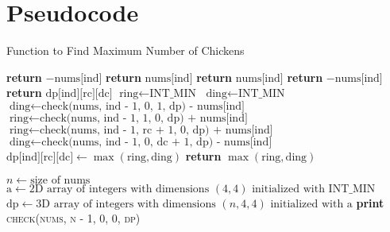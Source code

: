 \documentclass{article}
\begin{document}
\section{Pseudocode}
\begin{algorithm}
\caption{Function to Find Maximum Number of Chickens}
\begin{algorithmic}[1]

            \State \textbf{return} $-\text{nums[ind]}$ 
            \State \textbf{return} $\text{nums[ind]}$ 
            \State \textbf{return} $\text{nums[ind]}$ 
            \State \textbf{return} $-\text{nums[ind]}$ 
        \EndIf
    \EndIf
     
        \State \textbf{return} $\text{dp[ind][rc][dc]}$
    \EndIf
    \State $\text{ring} \gets \text{INT\_MIN}$ 
    \State $\text{ding} \gets \text{INT\_MIN}$
        \State $\text{ding} \gets \text{check(nums, ind - 1, 0, 1, dp) - nums[ind]}$ 
        \State $\text{ring} \gets \text{check(nums, ind - 1, 1, 0, dp) + nums[ind]}$ 
    \Else
        \State $\text{ring} \gets \text{check(nums, ind - 1, rc + 1, 0, dp) + nums[ind]}$ 
        \State $\text{ding} \gets \text{check(nums, ind - 1, 0, dc + 1, dp) - nums[ind]}$ 
    \EndIf
    \State $\text{dp[ind][rc][dc]} \gets \max(\text{ring}, \text{ding})$ 
    \State \textbf{return} $\max(\text{ring}, \text{ding})$ 
\EndFunction

\vspace{0.5cm}

    \State $n \gets \text{size of nums}$
    \State $\text{a} \gets \text{2D array of integers with dimensions } (4, 4) \text{ initialized with INT\_MIN}$
    \State $\text{dp} \gets \text{3D array of integers with dimensions } (n, 4, 4) \text{ initialized with a}$
    \State \textbf{print} \textsc{check(nums, n - 1, 0, 0, dp)}
\EndFunction

\end{algorithmic}
\end{algorithm}
\end{document}

